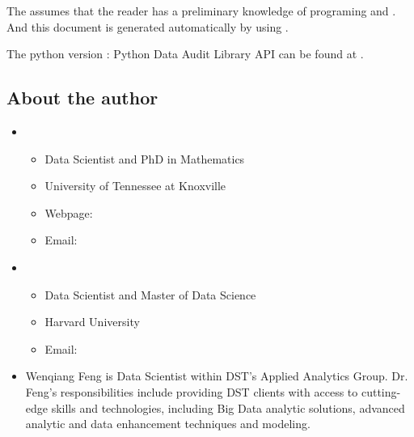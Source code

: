 \documentclass[letterpaper,12pt,english]{sphinxmanual}
\begin{document}
The  assumes that the reader has a preliminary knowledge of  programing and . And this document is generated automatically by using .

The python version : Python Data Audit Library API can be found at .


\subsection{About the author}
\label{\detokenize{preface:about-the-author}}\begin{itemize}
\item {} 
\begin{itemize}
\item {} 
Data Scientist and PhD in Mathematics

\item {} 
University of Tennessee at Knoxville

\item {} 
Webpage: 

\item {} 
Email: 

\end{itemize}

\item {} 
\begin{itemize}
\item {} 
Data Scientist and Master of Data Science

\item {} 
Harvard University

\item {} 
Email:  

\end{itemize}

\item {} 

Wenqiang Feng is Data Scientist within DST’s Applied Analytics Group. Dr. Feng’s responsibilities include providing DST clients with access to cutting-edge skills and technologies, including Big Data analytic solutions, advanced analytic and data enhancement techniques and modeling.


\end{itemize}
\end{document}
